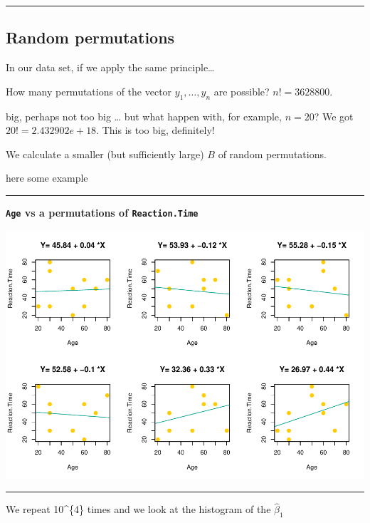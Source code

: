 \documentclass[]{article}
\begin{document}
\begin{center}\rule{0.5\linewidth}{\linethickness}\end{center}

\subsection{Random permutations}\label{random-permutations}

In our data set, if we apply the same principle\ldots{}

How many permutations of the vector \(y_1,\ldots,y_n\) are possible?
\(n!=3628800\).

big, perhaps not too big \ldots{} but what happen with, for example,
\(n=20\)? We got \(20!=2.432902e+18\). This is too big, definitely!

We calculate a smaller (but sufficiently large) \(B\) of random
permutations.

here some example

\begin{center}\rule{0.5\linewidth}{\linethickness}\end{center}

\textbf{\texttt{Age} vs a permutations of \texttt{Reaction.Time}}

\begin{center}\includegraphics{inference_booklet_files/figure-latex/unnamed-chunk-9-1} \end{center}

\begin{center}\rule{0.5\linewidth}{\linethickness}\end{center}

We repeat 10\^{}\{4\} times and we look at the histogram of the
\(\hat{\beta}_1\)
\end{document}
